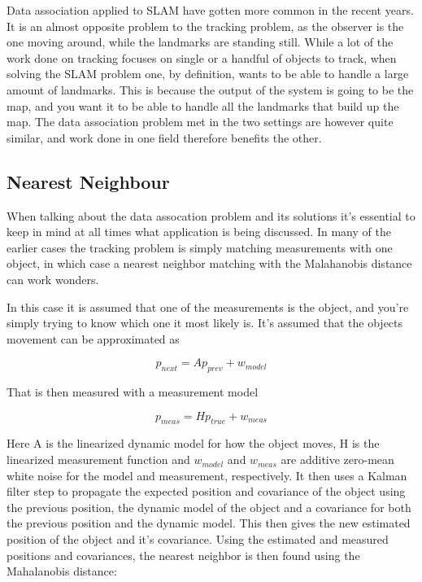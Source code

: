 Data association applied to SLAM have gotten more common in the recent years. It is an almost opposite problem to the tracking problem, as the observer is the one moving around, while the landmarks are standing still. While a lot of the work done on tracking focuses on single or a handful of objects to track, when solving the SLAM problem one, by definition, wants to be able to handle a large amount of landmarks. This is because the output of the system is going to be the map, and you want it to be able to handle all the landmarks that build up the map. The data association problem met in the two settings are however quite similar, and work done in one field therefore benefits the other. 

\subsection{Nearest Neighbour}

When talking about the data assocation problem and its solutions it's essential to keep in mind at all times what application is being discussed. In many of the earlier cases the tracking problem is simply matching measurements with one object, in which case a nearest neighbor matching with the Malahanobis distance can work wonders\cite{ShalomTracking}. 

In this case it is assumed that one of the measurements is the object, and you're simply trying to know which one it most likely is. It's assumed that the objects movement can be approximated as

\begin{equation}
    p_{next} = Ap_{prev} + w_{model}
\end{equation}

That is then measured with a measurement model

\begin{equation}
    p_{meas} = Hp_{true} + w_{meas}
\end{equation}
 
Here A is the linearized dynamic model for how the object moves, H is the linearized measurement function and $w_{model}$ and $w_{meas}$ are additive zero-mean white noise for the model and measurement, respectively. It then uses a Kalman filter step to propagate the expected position and covariance of the object using the previous position, the dynamic model of the object and a covariance for both the previous position and the dynamic model. This then gives the new estimated position of the object and it's covariance. Using the estimated and measured positions and covariances, the nearest neighbor is then found using the Mahalanobis distance\cite{MahalanobisTracking}:


